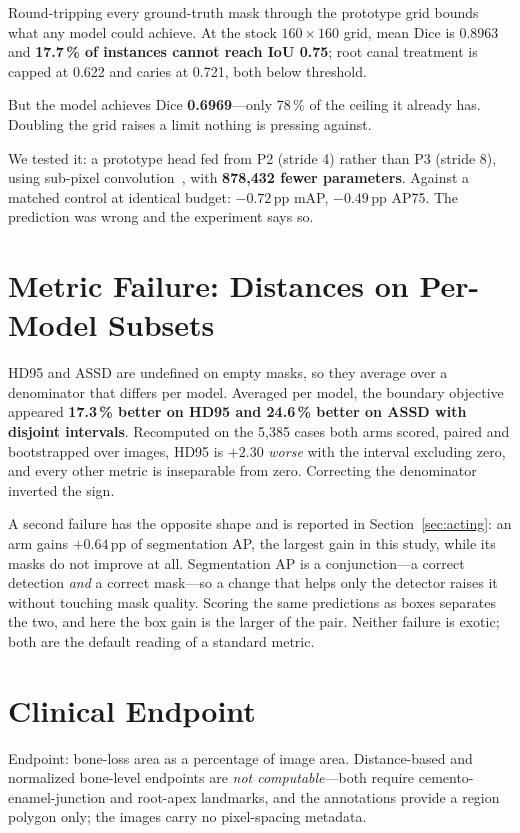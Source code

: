 \documentclass[11pt,letterpaper]{article}
\begin{document}
Round-tripping every ground-truth mask through the prototype grid bounds what
any model could achieve. At the stock $160\times160$ grid, mean Dice is 0.8963
and \textbf{17.7\,\% of instances cannot reach IoU 0.75}; root canal treatment
is capped at 0.622 and caries at 0.721, both below threshold.

But the model achieves Dice \textbf{0.6969}---only 78\,\% of the ceiling it
already has. Doubling the grid raises a limit nothing is pressing against.

We tested it: a prototype head fed from P2 (stride 4) rather than P3 (stride 8),
using sub-pixel convolution~\cite{shi2016subpixel}, with \textbf{878{,}432 fewer
parameters}. Against a matched control at identical budget: $-0.72$\,pp mAP,
$-0.49$\,pp AP75. The prediction was wrong and the experiment says so.

\section{Metric Failure: Distances on Per-Model Subsets}

HD95 and ASSD are undefined on empty masks, so they average over a denominator
that differs per model. Averaged per model, the boundary objective appeared
\textbf{17.3\,\% better on HD95 and 24.6\,\% better on ASSD with disjoint
intervals}. Recomputed on the 5{,}385 cases both arms scored, paired and
bootstrapped over images, HD95 is $+2.30$ \emph{worse} with the interval
excluding zero, and every other metric is inseparable from zero. Correcting the
denominator inverted the sign.

A second failure has the opposite shape and is reported in
Section~\ref{sec:acting}: an arm gains $+0.64$\,pp of segmentation AP, the
largest gain in this study, while its masks do not improve at all. Segmentation
AP is a conjunction---a correct detection \emph{and} a correct mask---so a
change that helps only the detector raises it without touching mask quality.
Scoring the same predictions as boxes separates the two, and here the box gain
is the larger of the pair. Neither failure is exotic; both are the default
reading of a standard metric.

\section{Clinical Endpoint}

Endpoint: bone-loss area as a percentage of image area. Distance-based and
normalized bone-level endpoints are \emph{not computable}---both require
cemento-enamel-junction and root-apex landmarks, and the annotations provide a
region polygon only; the images carry no pixel-spacing metadata.
\end{document}
